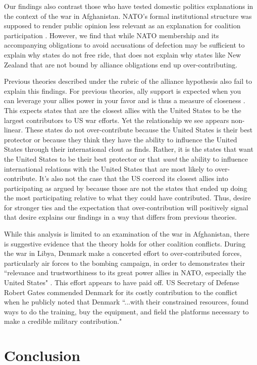 \documentclass[12pt,letterpaper]{article}
\begin{document}
		Our findings also contrast those who have tested domestic politics explanations in the context of the war in Afghanistan. NATO's formal institutional structure was supposed to render public opinion less relevant as an explanation for coalition participation \citep{kreps_eliteconsensusdeterminant_2010}. However, we find that while NATO membership and its accompanying obligations to avoid accusations of defection may be sufficient to explain why states do not free ride, that does not explain why states like New Zealand that are not bound by alliance obligations end up over-contributing.

		Previous theories described under the rubric of the alliance hypothesis also fail to explain this findings. For previous theories, ally support is expected when you can leverage your allies power in your favor and is thus a measure of closeness \citep{davidson_neoclassicalrealistexplanation_2011}. This expects states that are the closest allies with the United States to be the largest contributors to US war efforts. Yet the relationship we see appears non-linear. These states do not over-contribute because the United States is their best protector or because they think they have the ability to influence the United States through their international clout as \citet{ringsmose_natoburdensharingredux_2010} finds. Rather, it is the states that want the United States to be their best protector or that \textit{want} the ability to influence international relations with the United States that are most likely to over-contribute. It's also not the case that the US coerced its closest allies into participating as argued by \citet{kupchan_natopersiangulf_1988} because those are not the states that ended up doing the most participating relative to what they could have contributed. Thus, desire for stronger ties and the expectation that over-contribution will positively signal that desire explains our findings in a way that differs from previous theories.

		While this analysis is limited to an examination of the war in Afghanistan, there is suggestive evidence that the theory holds for other coalition conflicts. During the war in Libya, Denmark make a concerted effort to over-contributed forces, particularly air forces to the bombing campaign, in order to demonstrates their ``relevance and trustworthiness to its great power allies in NATO, especially the United States" \citep{jakobsen_prestigeseekingsmallstates_2018, dicke_natoburdensharinglibya_2013}. This effort appears to have paid off. US Secretary of Defense Robert Gates commended Denmark for its costly contribution to the conflict when he publicly noted that Denmark ``...with their constrained resources, found ways to do the training, buy the equipment, and field the platforms necessary to make a credible military contribution."

\section{Conclusion}




\end{document}
